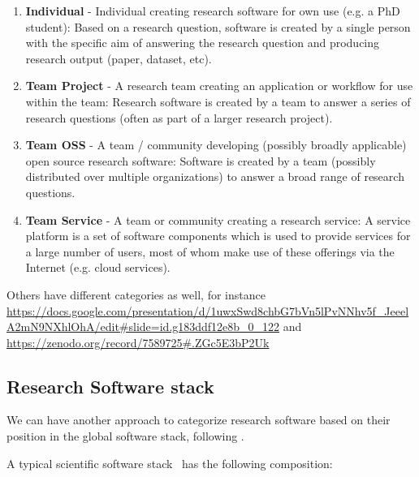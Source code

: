 \begin{enumerate}
    \item \textbf{Individual} - Individual creating research software for own use (e.g. a PhD student): Based on a research question, software is created by a single person with the specific aim of answering the research question and producing research output (paper, dataset, etc).
    \item \textbf{Team Project} - A research team creating an application or workflow for use within the team: Research software is created by a team to answer a series of research questions (often as part of a larger research project).
    \item \textbf{Team OSS} - A team / community developing (possibly broadly applicable) open source research software: Software is created by a team (possibly distributed over multiple organizations) to answer a broad range of research questions.
    \item \textbf{Team Service} - A team or community creating a research service: A service platform is a set of software components which is used to provide services for a large number of users, most of whom make use of these offerings via the Internet (e.g. cloud services).
\end{enumerate}

Others
have different categories as well, for instance
\url{https://docs.google.com/presentation/d/1uwxSwd8chbG7bVn5lPvNNhv5f_JeeelA2mN9NXhlOhA/edit#slide=id.g183ddf12e8b_0_122}
and \url{https://zenodo.org/record/7589725#.ZGc5E3bP2Uk}

\subsection{Research Software stack}

We can have another approach to categorize research software based on
their position in the global software stack, following
\cite{hinsen2019}.

A typical scientific software stack~\cite{hinsen2019} has the following composition:

